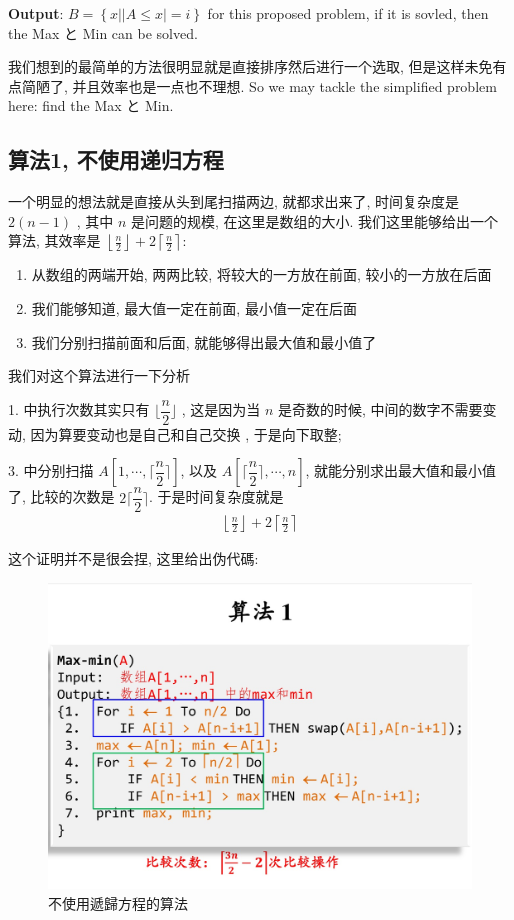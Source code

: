 \documentclass[a4paper, 10pt]{ctexart} %
\begin{document}
\noindent\textbf{Output}: $B = \left\{ x | \left| A \le x \right| = i \right\}$
for this proposed problem, if it is sovled, then the Max  と Min can be solved.

我们想到的最简单的方法很明显就是直接排序然后进行一个选取, 但是这样未免有点简陋了, 并且效率也是一点也不理想. So we may tackle the 
simplified problem here: find the Max と Min.

\subsection{算法1, 不使用递归方程}
一个明显的想法就是直接从头到尾扫描两边, 就都求出来了, 时间复杂度是 $2 \left(n-1\right)$ , 其中 $n$ 是问题的规模, 在这里是数组的大小.
我们这里能够给出一个算法, 其效率是 $\displaystyle \left\lfloor \frac{n}{2} \right\rfloor   +  2 \left\lceil \frac{n}{2} \right\rceil$: 

\begin{enumerate}
    \item 从数组的两端开始, 两两比较, 将较大的一方放在前面, 较小的一方放在后面
    \item 我们能够知道, 最大值一定在前面, 最小值一定在后面
    \item 我们分别扫描前面和后面, 就能够得出最大值和最小值了
\end{enumerate}
我们对这个算法进行一下分析

1. 中执行次数其实只有 $\lfloor \dfrac{n}{2} \rfloor$ , 
这是因为当 $n$ 是奇数的时候, 中间的数字不需要变动, 因为算要变动也是自己和自己交换
, 于是向下取整;

3. 中分别扫描 $A \left[ 1, \cdots  ,  \lceil \dfrac{n}{2} \rceil \right]$,
以及 $A \left[ \lceil \dfrac{n}{2} \rceil , \cdots   , n \right]$, 
就能分别求出最大值和最小值了, 
比较的次数是 $2 \lceil \dfrac{n}{2} \rceil$. 于是时间复杂度就是 
\begin{align*}
\displaystyle \left\lfloor \frac{n}{2} \right\rfloor   +  2 \left\lceil \frac{n}{2} \right\rceil
\end{align*}

\newpage
这个证明并不是很会捏, 这里给出伪代碼:
\begin{figure}[H]
    \centering
    \includegraphics[scale=0.3]{1.jpg}\caption{不使用遞歸方程的算法}
\end{figure}
\end{document}
